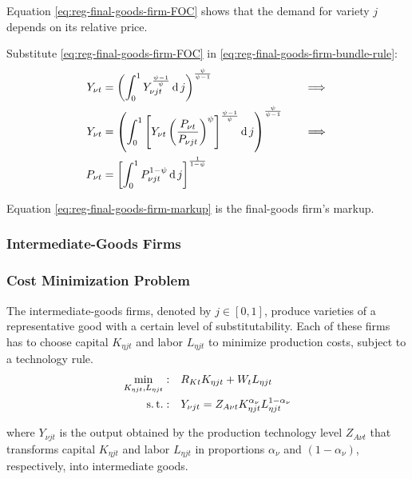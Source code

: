 \documentclass[
thesis.tex
]{subfiles}
\begin{document}
Equation \ref{eq:reg-final-goods-firm-FOC} shows that the demand for variety $j$ depends on its relative price. 

Substitute \ref{eq:reg-final-goods-firm-FOC} in \ref{eq:reg-final-goods-firm-bundle-rule}:
\begin{alignat}{2}
	Y_{\nu t} & = \left( \int_{0}^{1} Y_{\nu jt}^{\frac{\psi-1}{\psi}} \operatorname{d} j \right)^{\frac{\psi}{\psi-1}} &\implies \nonumber \\
	Y_{\nu t} & = \left( \int_{0}^{1} \left[ Y_{\nu t} \left( \frac{P_{\nu t}}{P_{\nu jt}} \right)^{\psi} \right]^{\frac{\psi-1}{\psi}} \operatorname{d} j \right)^{\frac{\psi}{\psi-1}} \quad &\implies \nonumber \\
	P_{\nu t} & = \left[ \int_{0}^{1} P_{\nu jt}^{1-\psi} \operatorname{d} j \right]^{\frac{1}{1-\psi}} \label{eq:reg-final-goods-firm-markup}
\end{alignat}

Equation \ref{eq:reg-final-goods-firm-markup} is the final-goods firm's markup.


\subsubsection{Intermediate-Goods Firms}

\subsubsection*{Cost Minimization Problem}

The intermediate-goods firms, denoted by $j \in [0,1]$, produce varieties of a representative good with a certain level of substitutability. Each of these firms has to choose capital $K_{\eta jt}$ and labor $L_{\eta jt}$ to minimize production costs, subject to a technology rule.
\begin{align}
	\label{eq:reg-int-good-firm-total-cost}
	\min_{K_{\eta jt}, L_{\eta jt}}: \quad & R_{Kt} K_{\eta jt} + W_t L_{\eta jt} \\
	\label{eq:reg-int-good-firm-production-function}
	\operatorname{s.t.}: \quad & Y_{\nu jt} = Z_{A\nu t} K_{\eta jt}^{\alpha_\nu} L_{\eta jt}^{1-{\alpha_\nu}}
\end{align}

where $Y_{\nu jt}$ is the output obtained by the production technology level $Z_{A\nu t}$\footnotemark{} that transforms capital $K_{\eta jt}$ and labor $L_{\eta jt}$ in proportions ${\alpha_\nu}$ and $(1-{\alpha_\nu})$, respectively, into intermediate goods.
\end{document}
